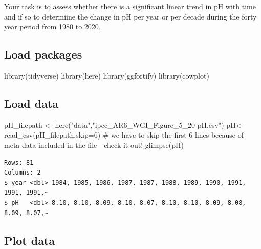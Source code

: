\documentclass[
  letterpaper,
  DIV=11,
  numbers=noendperiod]{scrreprt}
\newenvironment{Shaded}{\begin{snugshade}}{\end{snugshade}}
\newcommand{\AttributeTok}[1]{\textcolor[rgb]{0.40,0.45,0.13}{#1}}
\newcommand{\CommentTok}[1]{\textcolor[rgb]{0.37,0.37,0.37}{#1}}
\newcommand{\DecValTok}[1]{\textcolor[rgb]{0.68,0.00,0.00}{#1}}
\newcommand{\FunctionTok}[1]{\textcolor[rgb]{0.28,0.35,0.67}{#1}}
\newcommand{\NormalTok}[1]{\textcolor[rgb]{0.00,0.23,0.31}{#1}}
\newcommand{\OtherTok}[1]{\textcolor[rgb]{0.00,0.23,0.31}{#1}}
\newcommand{\StringTok}[1]{\textcolor[rgb]{0.13,0.47,0.30}{#1}}
\begin{document}
Your task is to assess whether there is a significant linear trend in pH
with time and if so to determiine the change in pH per year or per
decade during the forty year period from 1980 to 2020.

\subsection{Load packages}\label{load-packages-5}

\begin{Shaded}
\begin{Highlighting}[]
\FunctionTok{library}\NormalTok{(tidyverse)}
\FunctionTok{library}\NormalTok{(here)}
\FunctionTok{library}\NormalTok{(ggfortify)}
\FunctionTok{library}\NormalTok{(cowplot)}
\end{Highlighting}
\end{Shaded}

\subsection{Load data}\label{load-data-2}

\begin{Shaded}
\begin{Highlighting}[]
\NormalTok{pH\_filepath }\OtherTok{\textless{}{-}} \FunctionTok{here}\NormalTok{(}\StringTok{"data"}\NormalTok{,}\StringTok{"ipcc\_AR6\_WGI\_Figure\_5\_20{-}pH.csv"}\NormalTok{)}
\NormalTok{pH}\OtherTok{\textless{}{-}}\FunctionTok{read\_csv}\NormalTok{(pH\_filepath,}\AttributeTok{skip=}\DecValTok{6}\NormalTok{) }\CommentTok{\# we have to skip the first 6 lines because of meta{-}data included in the file {-} check it out!}
\FunctionTok{glimpse}\NormalTok{(pH)}
\end{Highlighting}
\end{Shaded}

\begin{verbatim}
Rows: 81
Columns: 2
$ year <dbl> 1984, 1985, 1986, 1987, 1987, 1988, 1989, 1990, 1991, 1991, 1991,~
$ pH   <dbl> 8.10, 8.10, 8.09, 8.10, 8.07, 8.10, 8.10, 8.09, 8.08, 8.09, 8.07,~
\end{verbatim}

\subsection{Plot data}\label{plot-data}
\end{document}
